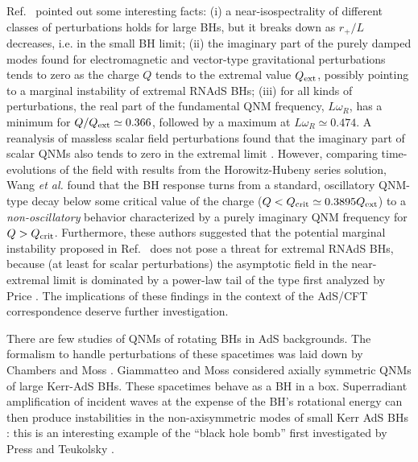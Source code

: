 \documentclass[]{iopart}
\begin{document}
Ref.~\cite{Berti:2003ud} pointed out some interesting facts: (i) a
near-isospectrality of different classes of perturbations holds for large BHs,
but it breaks down as $r_+/L$ decreases, i.e. in the small BH limit; (ii) the
imaginary part of the purely damped modes found for electromagnetic and
vector-type gravitational perturbations tends to zero as the charge $Q$ tends
to the extremal value $Q_{\rm ext}$, possibly pointing to a marginal
instability of extremal RNAdS BHs; (iii) for all kinds of perturbations, the
real part of the fundamental QNM frequency, $L \omega_R$, has a minimum for
$Q/Q_{\rm ext}\simeq 0.366$, followed by a maximum at $L\omega_R\simeq 0.474$.
A reanalysis of massless scalar field perturbations found that the imaginary
part of scalar QNMs also tends to zero in the extremal limit
\cite{Wang:2004bv}. However, comparing time-evolutions of the field with
results from the Horowitz-Hubeny series solution, Wang {\it et al.}
\cite{Wang:2004bv} found that the BH response turns from a standard,
oscillatory QNM-type decay below some critical value of the charge ($Q<Q_{\rm
  crit}\simeq 0.3895 Q_{\rm ext}$) to a {\em non-oscillatory} behavior
characterized by a purely imaginary QNM frequency for $Q>Q_{\rm
  crit}$. Furthermore, these authors suggested that the potential marginal
instability proposed in Ref.~\cite{Berti:2003ud} does not pose a threat for
extremal RNAdS BHs, because (at least for scalar perturbations) the asymptotic
field in the near-extremal limit is dominated by a power-law tail of the type
first analyzed by Price \cite{price}. The implications of these findings in
the context of the AdS/CFT correspondence deserve further investigation.

There are few studies of QNMs of rotating BHs in AdS backgrounds. The
formalism to handle perturbations of these spacetimes was laid down by
Chambers and Moss \cite{Chambers:1994ap}.  Giammatteo and Moss
\cite{Giammatteo:2005vu} considered axially symmetric QNMs of large Kerr-AdS
BHs.  These spacetimes behave as a BH in a box. Superradiant amplification of
incident waves at the expense of the BH's rotational energy can then produce
instabilities in the non-axisymmetric modes of small Kerr AdS BHs
\cite{Cardoso:2004nk,Cardoso:2004hs,Cardoso:2006wa,Kodama:2007sf,Aliev:2008yk,Kodama:2009rq,Murata:2008xr}:
this is an interesting example of the ``black hole bomb'' first investigated
by Press and Teukolsky \cite{BHBomb}.

\end{document}
